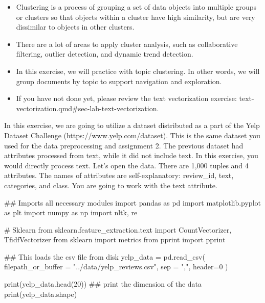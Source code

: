 \documentclass[
  letterpaper,
]{scrbook}
\newenvironment{Shaded}{\begin{snugshade}}{\end{snugshade}}
\newcommand{\BuiltInTok}[1]{\textcolor[rgb]{0.00,0.23,0.31}{#1}}
\newcommand{\CommentTok}[1]{\textcolor[rgb]{0.37,0.37,0.37}{#1}}
\newcommand{\DecValTok}[1]{\textcolor[rgb]{0.68,0.00,0.00}{#1}}
\newcommand{\ImportTok}[1]{\textcolor[rgb]{0.00,0.46,0.62}{#1}}
\newcommand{\NormalTok}[1]{\textcolor[rgb]{0.00,0.23,0.31}{#1}}
\newcommand{\OperatorTok}[1]{\textcolor[rgb]{0.37,0.37,0.37}{#1}}
\newcommand{\StringTok}[1]{\textcolor[rgb]{0.13,0.47,0.30}{#1}}
\providecommand{\tightlist}{%
  \setlength{\itemsep}{0pt}\setlength{\parskip}{0pt}}
\begin{document}
\begin{itemize}
\tightlist
\item
  Clustering is a process of grouping a set of data objects into
  multiple groups or clusters so that objects within a cluster have high
  similarity, but are very dissimilar to objects in other clusters.
\item
  There are a lot of areas to apply cluster analysis, such as
  collaborative filtering, outlier detection, and dynamic trend
  detection.
\item
  In this exercise, we will practice with topic clustering. In other
  words, we will group documents by topic to support navigation and
  exploration.
\item
  If you have not done yet, please review the text vectorization
  exercise: text-vectorization.qmd\#sec-lab-text-vectorization.
\end{itemize}

In this exercise, we are going to utilize a dataset distributed as a
part of the Yelp Dataset Challenge (https://www.yelp.com/dataset). This
is the same dataset you used for the data preprocessing and assignment
2. The previous dataset had attributes processed from text, while it did
not include text. In this exercise, you would directly process text.
Let's open the data. There are 1,000 tuples and 4 attributes. The names
of attributes are self-explanatory: review\_id, text, categories, and
class. You are going to work with the text attribute.

\begin{Shaded}
\begin{Highlighting}[]
\CommentTok{\#\# Imports all necessary modules}
\ImportTok{import}\NormalTok{ pandas }\ImportTok{as}\NormalTok{ pd}
\ImportTok{import}\NormalTok{ matplotlib.pyplot }\ImportTok{as}\NormalTok{ plt}
\ImportTok{import}\NormalTok{ numpy }\ImportTok{as}\NormalTok{ np}
\ImportTok{import}\NormalTok{ nltk, re}

\CommentTok{\# Sklearn}
\ImportTok{from}\NormalTok{ sklearn.feature\_extraction.text }\ImportTok{import}\NormalTok{ CountVectorizer, TfidfVectorizer}
\ImportTok{from}\NormalTok{ sklearn }\ImportTok{import}\NormalTok{ metrics}
\ImportTok{from}\NormalTok{ pprint }\ImportTok{import}\NormalTok{ pprint}

\CommentTok{\#\# This loads the csv file from disk}
\NormalTok{yelp\_data }\OperatorTok{=}\NormalTok{ pd.read\_csv(}
\NormalTok{    filepath\_or\_buffer }\OperatorTok{=} \StringTok{"../data/yelp\_reviews.csv"}\NormalTok{, sep }\OperatorTok{=} \StringTok{","}\NormalTok{, header}\OperatorTok{=}\DecValTok{0}\NormalTok{ )}

\BuiltInTok{print}\NormalTok{(yelp\_data.head(}\DecValTok{20}\NormalTok{))}
\CommentTok{\#\# print the dimension of the data}
\BuiltInTok{print}\NormalTok{(yelp\_data.shape)}
\end{Highlighting}
\end{Shaded}
\end{document}
